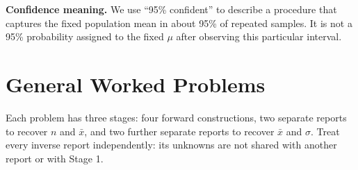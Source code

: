 \textbf{Confidence meaning.} We use ``95\% confident'' to describe a procedure that captures the fixed population mean in about 95\% of repeated samples. It is not a 95\% probability assigned to the fixed $\mu$ after observing this particular interval.

\clearpage
\section{General Worked Problems}\label{sec:general-worked}
\label{sec:worked-solution-examples}
\par\vspace{5mm}
Each problem has three stages: four forward constructions, two separate reports to recover
$n$ and $\bar x$, and two further separate reports to recover $\bar x$ and $\sigma$.
Treat every inverse report independently: its unknowns are not shared with another report
or with Stage 1. 


